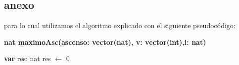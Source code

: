 \subsection*{anexo}

\vspace*{1cm}
	
para lo cual utilizamos el algoritmo explicado con el siguiente pseudocódigo:
	
\textbf{nat maximoAsc(ascenso: vector(nat), v: vector(int),i: nat)}\\
	\begin{algorithm}[H]
	
      \textbf{var} res: nat
      res $\leftarrow$ 0
	
  \end{algorithm}



